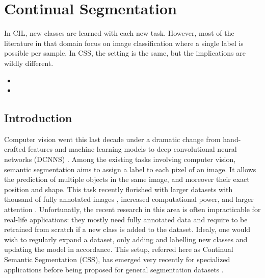 \chapter{Continual Segmentation}
\label{chapter:segmentation}

\begin{chapabstract}
    In \acf{CIL}, new classes are learned with each new task. However, most of the literature in
    that domain focus on image classification where a single label is possible per sample. In
    \acf{CSS}, the setting is the same, but the implications are wildly different.


    \begin{itemize}
        \item {}
        \item {}
    \end{itemize}

\end{chapabstract}
\newpage

\minitoc
{}



\section{Introduction}



Computer vision went this last decade under a dramatic change from hand-crafted features
\citep{lowe1999sift,perronnin2007fisherkernels} and machine learning models \citep{cortes1995svm} to
deep convolutional neural networks (DCNNS) \citep{krizhevsky2012alexnet}. Among the existing tasks
involving computer vision, semantic segmentation aims to assign a label to each pixel of an image.
It allows the prediction of multiple objects in the same image, and moreover their exact position
and shape. This task recently florished \citep{tao2020HRNet,zhang2020resnest,chen2018ZPSA} with
larger datasets with thousand of fully annotated images
\citep{zhou2017adedataset,neuhold2017mapillary}, increased computational power, and larger attention
\citep{wang2020axialdeeplab}. Unfortunatly, the recent research in this area is often impracticable
for real-life applications: they mostly need fully annotated data and require to be retrained from
scratch if a new class is added to the dataset. Idealy, one would wish to regularly expand a
dataset, only adding and labelling new classes and updating the model in accordance. This setup,
referred here as Continual Semantic Segmentation (CSS), has emerged very recently for specialized
applications
\citep{ozdemir2018learnthenewkeeptheold,ozdemir2019segmentationanotomical,tasar19incrementsegmentationremotesensing}
before being proposed for general segmentation datasets
\citep{michieli2019ilt,cermelli2020modelingthebackground,douillard2020plop}.

